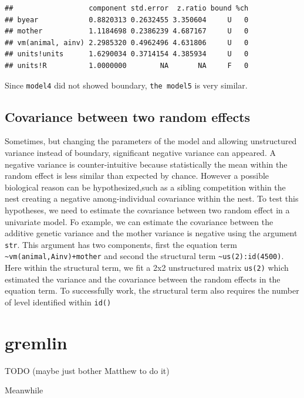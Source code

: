 \documentclass[
  12pt,
]{book}
\begin{document}
\begin{verbatim}
##                  component std.error  z.ratio bound %ch
## byear            0.8820313 0.2632455 3.350604     U   0
## mother           1.1184698 0.2386239 4.687167     U   0
## vm(animal, ainv) 2.2985320 0.4962496 4.631806     U   0
## units!units      1.6290034 0.3714154 4.385934     U   0
## units!R          1.0000000        NA       NA     F   0
\end{verbatim}

Since \texttt{model4} did not showed boundary, \texttt{the\ model5} is very similar.

\hypertarget{covariance-between-two-random-effects}{%
\subsection{Covariance between two random effects}\label{covariance-between-two-random-effects}}

Sometimes, but changing the parameters of the model and allowing unstructured variance instead of boundary, significant negative variance can appeared.
A negative variance is counter-intuitive because statistically the mean within the random effect is less similar than expected by chance. However a possible biological reason can be hypothesized,such as a sibling competition within the nest creating a negative among-individual covariance within the nest.
To test this hypotheses, we need to estimate the covariance between two random effect in a univariate model.
Fo example, we can estimate the covariance between the additive genetic variance and the mother variance is negative using the argument \texttt{str}. This argument has two components, first the equation term \texttt{\textasciitilde{}vm(animal,Ainv)+mother} and second the structural term \texttt{\textasciitilde{}us(2):id(4500)}. Here within the structural term, we fit a 2x2 unstructured matrix \texttt{us(2)} which estimated the variance and the covariance between the random effects in the equation term. To successfully work, the structural term also requires the number of level identified within \texttt{id()}

\hypertarget{gremlin-1}{%
\section{gremlin}\label{gremlin-1}}

TODO (maybe just bother Matthew to do it)

Meanwhile
\end{document}
